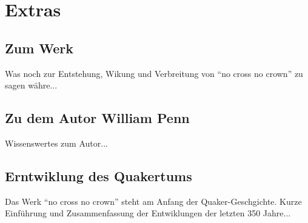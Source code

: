 
\part{Extras}


\chapter{Zum Werk}
Was noch zur Entstehung, Wikung und Verbreitung von "`no cross no crown"' zu sagen währe...

\chapter{Zu dem Autor William Penn}
Wissenswertes zum Autor...

\chapter{Erntwiklung des Quakertums}
Das Werk "`no cross no crown"' steht am Anfang der Quaker-Geschgichte. Kurze Einführung und Zusammenfassung der Entwiklungen der letzten 350 Jahre...
